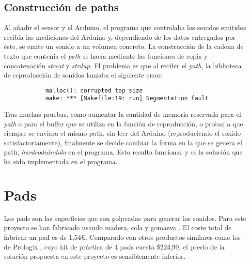 
        \subsection{Construcción de paths} %
        \label{sub:ConstruccionDePaths}

            Al añadir el sensor y el Arduino, el programa que controlaba los sonidos emitidos recibía las mediciones
            del Arduino y, dependiendo de los datos entregados por éste, se emite un sonido a un volumen concreto.
            La construcción de la cadena de texto que contenía el \textit{path} se hacía mediante las funciones de
            copia y concatenación \textit{strcat} y \textit{strdup}. El problema es que al recibir el \textit{path},
            la biblioteca de reproducción de sonidos lanzaba el siguiente error:

            \begin{verbatim}
            malloc(): corrupted top size
            make: *** [Makefile:19: run] Segmentation fault
            \end{verbatim}

            Tras muchas pruebas, como aumentar la cantidad de memoria reservada para el \textit{path} o para el
            buffer que se utiliza en la función de reproducción, o probar a que siempre se enviara el mismo path,
            sin leer del Arduino (reproduciendo el sonido satisfactoriamente), finalmente se decide cambiar la forma en
            la que se genera el path, \textit{hardcodeándolo} en el programa. Esto resulta funcionar y es la solución
            que ha sido implementada en el programa.



    \section{Pads} %
    \label{sec:Pads}

        Los pads son las superficies que son golpeadas para generar los sonidos. Para este proyecto se han fabricado
        usando madera, cola y gomaeva \cite{GomaEva}. El coste total de fabricar un pad es de 1,54\euro{}. Comparado
        con otros productos similares como los de Prologix \cite{practice_pad}, cuyo kit de práctica de 4 pads cuesta
        \$224,99, el precio de la solución propuesta en este proyecto es sensiblemente inferior.

